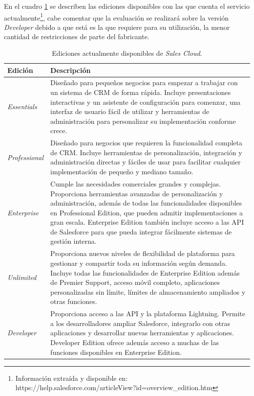 En el cuadro \ref{ediciones} se describen las ediciones disponibles con las que
cuenta el servicio actualmente\footnote{Información extraída y disponible en:
https://help.salesforce.com/articleView?id=overview\_edition.htm}, cabe comentar
que la evaluación se realizará sobre la versión \emph{Developer} debido a que
está es la que requiere para su utilización, la menor cantidad de restricciones
de parte del fabricante.

\begin{table}[H]
\centering
\begin{tabular}{|l|p{12.0cm}|}
\hline
\footnotesize{\textbf{Edición}} & \footnotesize{\textbf{Descripción}} \\
\hline
\footnotesize{\emph{Essentials}} & \footnotesize{Diseñado para pequeños negocios
para empezar a trabajar con un sistema de CRM de forma rápida. Incluye
presentaciones interactivas y un asistente de configuración para comenzar, una
interfaz de usuario fácil de utilizar y herramientas de administración para
personalizar su implementación conforme crece.} \\
\footnotesize{\emph{Professional}} & \footnotesize{Diseñado para negocios que
requieren la funcionalidad completa de CRM. Incluye herramientas de
personalización, integración y administración directas y fáciles de usar para
facilitar cualquier implementación de pequeño y mediano tamaño.} \\
\footnotesize{\emph{Enterprise}} & \footnotesize{Cumple las necesidades
comerciales grandes y complejas. Proporciona herramientas avanzadas de
personalización y administración, además de todas las funcionalidades
disponibles en Professional Edition, que pueden admitir implementaciones a gran
escala. Enterprise Edition también incluye acceso a las API de Salesforce para
que pueda integrar fácilmente sistemas de gestión interna.} \\
\footnotesize{\emph{Unlimited}} & \footnotesize{Proporciona nuevos niveles de
flexibilidad de plataforma para gestionar y compartir toda su información según
demanda. Incluye todas las funcionalidades de Enterprise Edition además de
Premier Support, acceso móvil completo, aplicaciones personalizadas sin límite,
límites de almacenamiento ampliados y otras funciones.} \\
\footnotesize{\emph{Developer}} & \footnotesize{Proporciona acceso a las API y
la plataforma Lightning. Permite a los desarrolladores ampliar Salesforce,
integrarlo con otras aplicaciones y desarrollar nuevas herramientas y
aplicaciones. Developer Edition ofrece además acceso a muchas de las funciones
disponibles en Enterprise Edition.} \\
\hline
\end{tabular}
\caption{Ediciones actualmente disponibles de \emph{Sales Cloud}.}
\label{ediciones}
\end{table}

